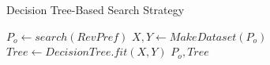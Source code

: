 

\begin{algorithm}[H]
\small
\caption{Decision Tree-Based Search Strategy}\label{alg:decision_tree_search}
\begin{algorithmic}
\State $P_o \gets search(RevPref)$
\State $X, Y \gets MakeDataset(P_o)$
\State $Tree \gets DecisionTree.fit(X,Y)$
\State \Return \textit{$P_o, Tree$}
\EndFunction
\end{algorithmic}
\end{algorithm}
\vspace{-1.5em}

